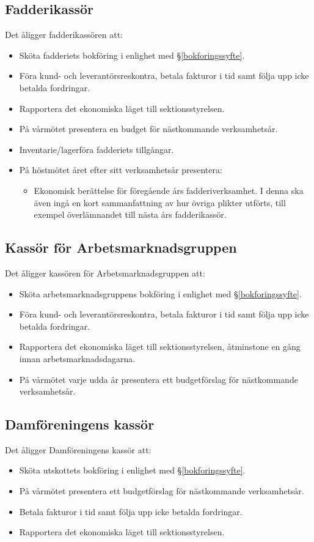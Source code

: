\documentclass{datateknologsektionen-document}
\begin{document}
\subsection{Fadderikassör}
\label{fadderikassor}
Det åligger fadderikassören att:
\begin{itemize}
  \item Sköta fadderiets bokföring i enlighet med \S \ref{bokforingssyfte}.
  \item Föra kund- och leverantörsreskontra, betala fakturor i tid samt följa upp icke betalda fordringar.
  \item Rapportera det ekonomiska läget till sektionsstyrelsen.
  \item På vårmötet presentera en budget för nästkommande verksamhetsår.
  \item Inventarie/lagerföra fadderiets tillgångar.
  \item På höstmötet året efter sitt verksamhetsår presentera:
  \begin{itemize}
    \item Ekonomisk berättelse för föregående års fadderiverksamhet. I denna ska även ingå
    en kort sammanfattning av hur övriga plikter utförts, till exempel överlämnandet till
    nästa års fadderikassör.
  \end{itemize}
\end{itemize}

\subsection{Kassör för Arbetsmarknadsgruppen}
\label{amgkassor}
Det åligger kassören för Arbetsmarknadsgruppen att:
\begin{itemize}
  \item Sköta arbetsmarknadsgruppens bokföring i enlighet med \S \ref{bokforingssyfte}.
  \item Föra kund- och leverantörsreskontra, betala fakturor i tid samt följa upp icke betalda fordringar.
  \item Rapportera det ekonomiska läget till sektionsstyrelsen, åtminstone en gång innan arbetsmarknadsdagarna.
  \item På vårmötet varje udda år presentera ett budgetförslag för nästkommande verksamhetsår.
\end{itemize}

\subsection{Damföreningens kassör}
\label{damforeningskassor}
Det åligger Damföreningens kassör att:
\begin{itemize}
  \item Sköta utskottets bokföring i enlighet med \S \ref{bokforingssyfte}.
  \item På vårmötet presentera ett budgetförslag för nästkommande verksamhetsår.
  \item Betala fakturor i tid samt följa upp icke betalda fordringar.
  \item Rapportera det ekonomiska läget till sektionsstyrelsen.
\end{itemize}
\end{document}
